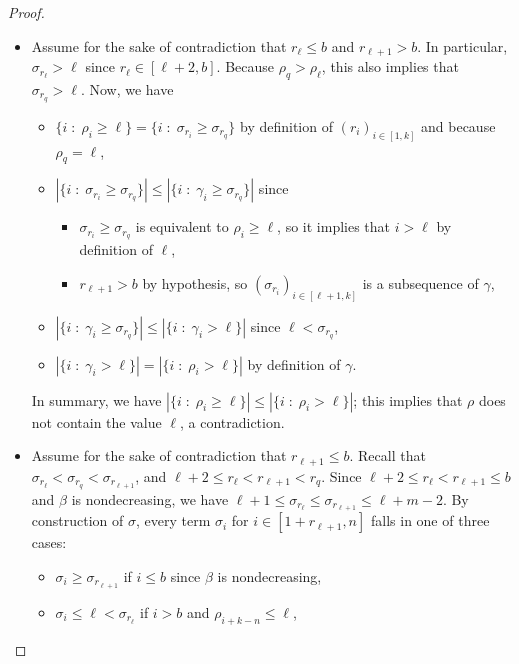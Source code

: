\documentclass[10pt,a4paper]{amsart}
\begin{document}
\begin{proof}
    \begin{itemize}
        \item Assume for the sake of contradiction that $r_\ell \leq b$ and $r_{\ell+1} > b$. In particular, $\sigma_{r_{\ell}} > \ell$ since $r_\ell \in [\ell+2, b]$. Because $\rho_q > \rho_\ell$, this also implies that $\sigma_{r_q} > \ell$. Now, we have
        \begin{itemize}
            \item $\{i \; : \; \rho_i \geq \ell \} = \{i \; : \; \sigma_{r_i} \geq \sigma_{r_q}\}$ by definition of $(r_i)_{i \in [1,k]}$ and because $\rho_q = \ell$,
            \item $|\{i \; : \; \sigma_{r_i} \geq \sigma_{r_q}\}| \leq |\{i \; : \; \gamma_i \geq \sigma_{r_q}\}|$ since 
            \begin{itemize}
                \item $\sigma_{r_i} \geq \sigma_{r_q}$ is equivalent to $\rho_i \geq \ell$, so it implies that $i > \ell$ by definition of $\ell$,
                \item $r_{\ell+1} > b$ by hypothesis, so $(\sigma_{r_i})_{i \in [\ell+1,k]}$ is a subsequence of $\gamma$,
            \end{itemize}
            \item $|\{i \; : \; \gamma_i \geq \sigma_{r_q}\}| \leq |\{i \; : \; \gamma_i > \ell\}|$ since $\ell < \sigma_{r_q}$,
            \item $|\{i \; : \; \gamma_i > \ell\}| = |\{i \; : \; \rho_i > \ell\}|$ by definition of $\gamma$.
        \end{itemize}
        In summary, we have $|\{i \; : \; \rho_i \geq \ell \}| \leq |\{i \; : \; \rho_i > \ell\}|$; this implies that $\rho$ does not contain the value $\ell$, a contradiction.
        \item Assume for the sake of contradiction that $r_{\ell+1} \leq b$. Recall that $\sigma_{r_\ell} < \sigma_{r_q} < \sigma_{r_{\ell+1}}$, and $\ell + 2 \leq r_\ell < r_{\ell+1} < r_q$. Since $\ell+2 \leq r_\ell < r_{\ell+1} \leq b$ and $\beta$ is nondecreasing, we have $\ell+1 \leq \sigma_{r_\ell} \leq \sigma_{r_{\ell+1}} \leq \ell + m - 2$. By construction of $\sigma$, every term $\sigma_i$ for $i \in [1+r_{\ell+1}, n]$ falls in one of three cases:
        \begin{itemize}
            \item $\sigma_i \geq \sigma_{r_{\ell+1}}$ if $i \leq b$ since $\beta$ is nondecreasing,
            \item $\sigma_i \leq \ell < \sigma_{r_\ell}$ if $i > b$ and $\rho_{i+k-n} \leq \ell$,

\end{itemize}
\end{itemize}
\end{proof}
\end{document}
